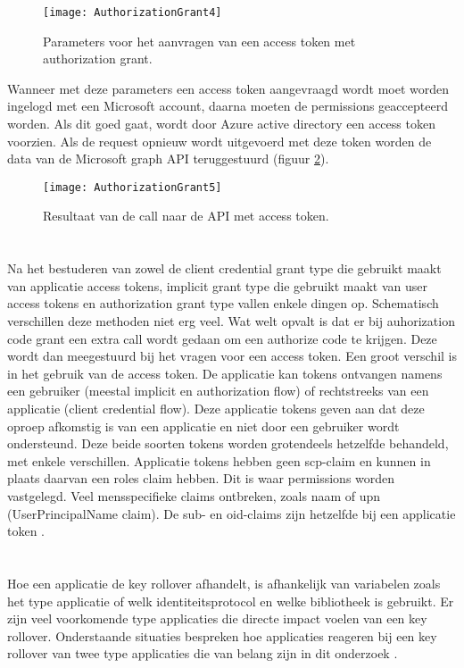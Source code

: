 \begin{figure}[H]
	\centering
	\texttt{[image: AuthorizationGrant4]} 
	\caption[AthorizationGrant4]{Parameters voor het aanvragen van een access token met authorization grant.}
	\label{fig:authGrant4}
	\scriptsize
\end{figure}
Wanneer met deze parameters een access token aangevraagd wordt moet worden ingelogd met een Microsoft account, daarna moeten de permissions geaccepteerd worden. Als dit goed gaat, wordt door Azure active directory een access token voorzien. Als de request opnieuw wordt uitgevoerd met deze token worden de data van de Microsoft graph API teruggestuurd (figuur \ref{fig:authGrant5}).
\begin{figure}[H]
	\centering
	\texttt{[image: AuthorizationGrant5]} 
	\caption[AthorizationGrant5]{Resultaat van de call naar de API met access token.}
	\label{fig:authGrant5}
	\scriptsize
\end{figure}
\section{}
\label{sec:comparePoc}
Na het bestuderen van zowel de client credential grant type die gebruikt maakt van applicatie access tokens, implicit grant type die gebruikt maakt van user access tokens en authorization grant type vallen enkele dingen op. Schematisch verschillen deze methoden niet erg veel. Wat welt opvalt is dat er bij auhorization code grant een extra call wordt gedaan om een authorize code te krijgen. Deze wordt dan meegestuurd bij het vragen voor een access token. \newline
Een groot verschil is in het gebruik van de access token. De applicatie kan tokens ontvangen namens een gebruiker (meestal implicit en authorization flow) of rechtstreeks van een applicatie (client credential flow). Deze applicatie tokens geven aan dat deze oproep afkomstig is van een applicatie en niet door een gebruiker wordt ondersteund. Deze beide soorten tokens worden grotendeels hetzelfde behandeld, met enkele verschillen. Applicatie tokens hebben geen scp-claim en kunnen in plaats daarvan een roles claim hebben. Dit is waar permissions worden vastgelegd. Veel mensspecifieke claims ontbreken, zoals naam of upn (UserPrincipalName claim). De sub- en oid-claims zijn hetzelfde bij een applicatie token \autocite{hpsin2020}.
\section{}
\label{sec:keyrollover}
Hoe een applicatie de key rollover afhandelt, is afhankelijk van variabelen zoals het type applicatie of welk identiteitsprotocol en welke bibliotheek is gebruikt. Er zijn veel voorkomende type applicaties die directe impact voelen van een key rollover. Onderstaande situaties bespreken hoe applicaties reageren bij een key rollover van twee type applicaties die van belang zijn in dit onderzoek .
